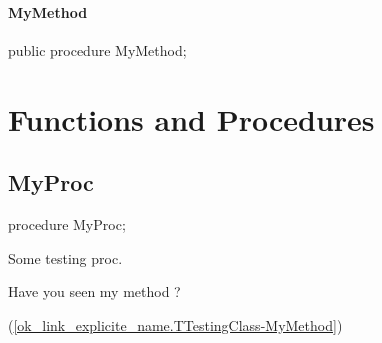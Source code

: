 \documentclass{report}
\newif\ifpdf
\begin{document}
\paragraph*{MyMethod}\hspace*{\fill}

\label{ok_link_explicite_name.TTestingClass-MyMethod}
\begin{list}{}{
\setlength{\itemindent}{0cm}
\setlength{\listparindent}{0cm}
\setlength{\leftmargin}{\evensidemargin}
\addtolength{\leftmargin}{\tmplength}
\settowidth{\labelsep}{X}
\addtolength{\leftmargin}{\labelsep}
\setlength{\labelwidth}{\tmplength}
}
\item[\textbf{Declaration}\hfill]
\ifpdf
\begin{flushleft}
\fi
\begin{ttfamily}
public procedure MyMethod;\end{ttfamily}

\ifpdf
\end{flushleft}
\fi

\end{list}
\section{Functions and Procedures}
\ifpdf
\subsection*{\large{\textbf{MyProc}}\normalsize\hspace{1ex}\hrulefill}
\else
\subsection*{MyProc}
\fi
\label{ok_link_explicite_name-MyProc}
\begin{list}{}{
\setlength{\itemindent}{0cm}
\setlength{\listparindent}{0cm}
\setlength{\leftmargin}{\evensidemargin}
\addtolength{\leftmargin}{\tmplength}
\settowidth{\labelsep}{X}
\addtolength{\leftmargin}{\labelsep}
\setlength{\labelwidth}{\tmplength}
}
\item[\textbf{Declaration}\hfill]
\ifpdf
\begin{flushleft}
\fi
\begin{ttfamily}
procedure MyProc;\end{ttfamily}

\ifpdf
\end{flushleft}
\fi

\par
\item[\textbf{Description}]
Some testing proc. \begin{ttfamily}Have you seen my method ?\end{ttfamily}(\ref{ok_link_explicite_name.TTestingClass-MyMethod})

\end{list}
\end{document}
